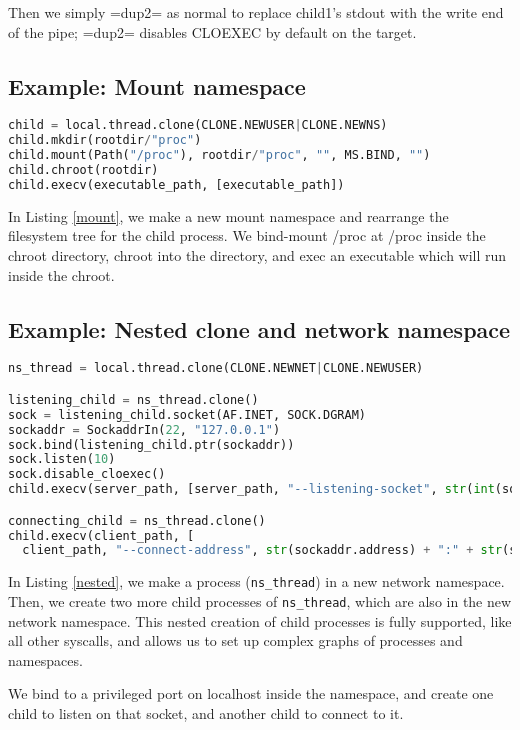 \documentclass{acmart}
\begin{document}
Then we simply =dup2= as normal to replace child1's stdout with the write end of the pipe;
=dup2= disables CLOEXEC by default on the target.
\subsection{Example: Mount namespace}
\begin{lstlisting}[float,language=Python,label={mount},caption={Mount namespace}]
child = local.thread.clone(CLONE.NEWUSER|CLONE.NEWNS)
child.mkdir(rootdir/"proc")
child.mount(Path("/proc"), rootdir/"proc", "", MS.BIND, "")
child.chroot(rootdir)
child.execv(executable_path, [executable_path])
\end{lstlisting}
In Listing \ref{mount},
we make a new mount namespace and rearrange the filesystem tree for the child process.
We bind-mount /proc at /proc inside the chroot directory,
chroot into the directory,
and exec an executable which will run inside the chroot.
\subsection{Example: Nested clone and network namespace}
\begin{lstlisting}[float,language=Python,label={nested},caption={Nested clone and network namespace}]
ns_thread = local.thread.clone(CLONE.NEWNET|CLONE.NEWUSER)

listening_child = ns_thread.clone()
sock = listening_child.socket(AF.INET, SOCK.DGRAM)
sockaddr = SockaddrIn(22, "127.0.0.1")
sock.bind(listening_child.ptr(sockaddr))
sock.listen(10)
sock.disable_cloexec()
child.execv(server_path, [server_path, "--listening-socket", str(int(sock))])

connecting_child = ns_thread.clone()
child.execv(client_path, [
  client_path, "--connect-address", str(sockaddr.address) + ":" + str(sockaddr.port)])
\end{lstlisting}
In Listing \ref{nested},
we make a process (\texttt{ns\_thread}) in a new network namespace.
Then, we create two more child processes of \texttt{ns\_thread},
which are also in the new network namespace.
This nested creation of child processes is fully supported,
like all other syscalls,
and allows us to set up complex graphs of processes and namespaces.

We bind to a privileged port on localhost inside the namespace,
and create one child to listen on that socket,
and another child to connect to it.
\end{document}
